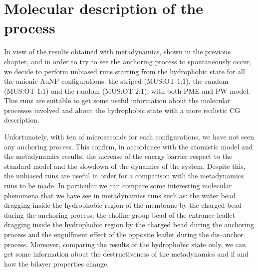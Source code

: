 \chapter{Molecular description of the process}
In view of the results obtained with metadynamics, shown in the previous chapter, and in order to try to see the anchoring process to spontaneously occur, we decide to perform unbiased runs starting from the hydrophobic state for all the anionic \ac{AuNP} configurations: the striped (\ac{MUS}:\ac{OT} $1$:$1$), the random (\ac{MUS}:\ac{OT} $1$:$1$) and the random (\ac{MUS}:\ac{OT} $2$:$1$), with both \ac{PME} and \ac{PW} model. This runs are suitable to get some useful information about the molecular processes involved and about the hydrophobic state with a more realistic \ac{CG} description.

Unfortunately, with ten of microseconds for each configurations, we have not seen any anchoring process. This confirm, in accordance with the atomistic model and the metadynamics results, the increase of the energy barrier respect to the standard \martini model and the slowdown of the dynamics of the system. Despite this, the unbiased runs are useful in order for a comparison with the metadynamics runs to be made. In particular we can compare some interesting molecular phenomena that we have see in metadynamics runs such as: the water bead dragging inside the hydrophobic region of the membrane by the charged bead during the anchoring process; the choline group bead of the entrance leaflet dragging inside the hydrophobic region by the charged bead during the anchoring process and the engulfment effect of the opposite leaflet during the dis--anchor process. Moreover, comparing the results of the hydrophobic state only, we can get some information about the destructiveness of the metadynamics and if and how the bilayer properties change. 


